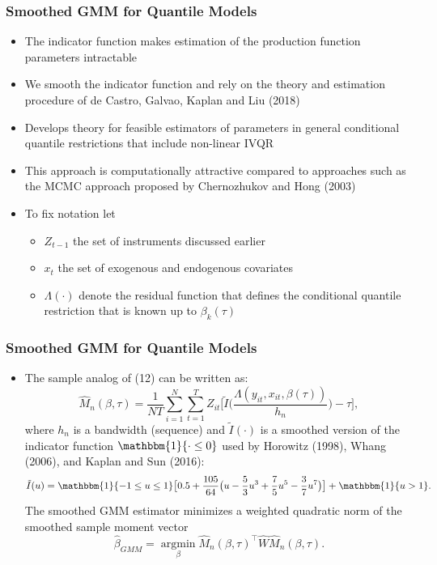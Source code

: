 \documentclass{beamer}
\begin{document}
\begin{frame}
\frametitle{Smoothed GMM for Quantile Models}
\begin{itemize}
	\item The indicator function makes estimation of the production function parameters intractable
	\item We smooth the indicator function and rely on the theory and estimation procedure of de Castro, Galvao, Kaplan and Liu (2018)
	\item Develops theory for feasible estimators of parameters in general conditional quantile restrictions that include non-linear IVQR
	\item This approach is computationally attractive compared to approaches such as the MCMC approach proposed by Chernozhukov and Hong (2003)
	\pause
	\item To fix notation let
	\begin{itemize}
		\item $Z_{t-1}$ the set of instruments discussed earlier
		\item $x_{t}$ the set of exogenous and endogenous covariates
		\item $\Lambda(\cdot)$ denote the residual function that defines the conditional quantile restriction that is known up to $\beta_{k}(\tau)$
	\end{itemize}
	
\end{itemize}
\end{frame}

\begin{frame}
\frametitle{Smoothed GMM for Quantile Models}
\begin{itemize}
	\item The sample analog of (12) can be written as:
	\begin{equation}
    \hat{M}_{n}(\beta, \tau)=\frac{1}{NT}\sum_{i=1}^{N}\sum_{t=1}^{T}Z_{it}\Bigg[\tilde{I}\Bigg(\frac{\Lambda(y_{it}, x_{it}, \beta(\tau))}{h_{n}}\Bigg)-\tau\Bigg],
	\end{equation}
	\pause
	where $h_{n}$ is a bandwidth (sequence) and $\tilde{I}(\cdot)$ is a smoothed version of the indicator function $\mathbbm{1}\{\cdot \leq 0\}$ used by Horowitz (1998), Whang (2006), and Kaplan and Sun (2016):
	\begin{equation}
	    \tilde{I}(u)=\mathbbm{1}\{-1\leq u \leq 1\}\big[0.5+\frac{105}{64}\big(u-\frac{5}{3}u^{3}+\frac{7}{5}u^{5}- \frac{3}{7}u^{7}\big)\big]+\mathbbm{1}\{u>1\}.
	\end{equation}
	\pause
	The smoothed GMM estimator minimizes a weighted quadratic norm of the smoothed sample moment vector
	\begin{equation}
		\hat{\beta}_{GMM}=\underset{\beta}{\operatorname{argmin}}\hat{M}_{n}(\beta, \tau)^{\top}\hat{W}\hat{M}_{n}(\beta, \tau).
		\end{equation}
\end{itemize}
\end{frame}
\end{document}
